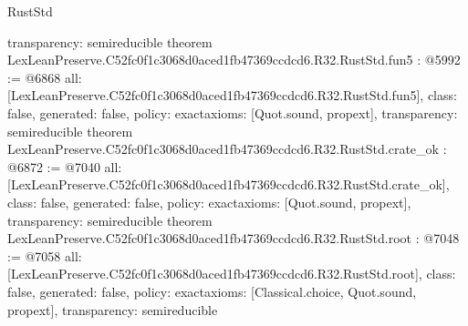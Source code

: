 \begin{lexlean}{RustStd}
\begin{coremodule}
{  transparency: semireducible
}
theorem LexLeanPreserve.C52fc0f1c3068d0aced1fb47369ccdcd6.R32.RustStd.fun5 : @5992 := @6868 {
  all: [LexLeanPreserve.C52fc0f1c3068d0aced1fb47369ccdcd6.R32.RustStd.fun5],
  class: false,
  generated: false,
  policy: exact{axioms: [Quot.sound, propext]},
  transparency: semireducible
}
theorem LexLeanPreserve.C52fc0f1c3068d0aced1fb47369ccdcd6.R32.RustStd.crate_ok : @6872 := @7040 {
  all: [LexLeanPreserve.C52fc0f1c3068d0aced1fb47369ccdcd6.R32.RustStd.crate_ok],
  class: false,
  generated: false,
  policy: exact{axioms: [Quot.sound, propext]},
  transparency: semireducible
}
theorem LexLeanPreserve.C52fc0f1c3068d0aced1fb47369ccdcd6.R32.RustStd.root : @7048 := @7058 {
  all: [LexLeanPreserve.C52fc0f1c3068d0aced1fb47369ccdcd6.R32.RustStd.root],
  class: false,
  generated: false,
  policy: exact{axioms: [Classical.choice, Quot.sound, propext]},
  transparency: semireducible
}


\end{coremodule}
\end{lexlean}
